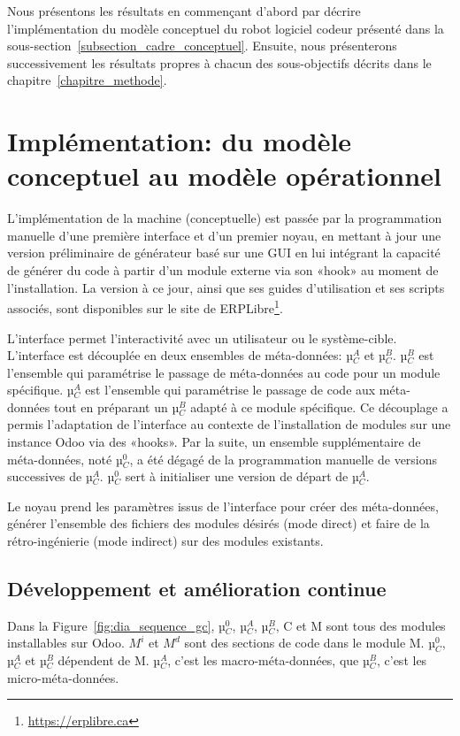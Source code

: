 \label{sec:Theme2}

Nous présentons les résultats en commençant d’abord par décrire l’implémentation du modèle conceptuel du robot logiciel codeur présenté dans la sous-section~\ref{subsection_cadre_conceptuel}. Ensuite, nous présenterons successivement les résultats propres à chacun des sous-objectifs décrits dans le chapitre~\ref{chapitre_methode}.

\section{Implémentation: du modèle conceptuel au modèle opérationnel}

L’implémentation de la machine (conceptuelle) est passée par la programmation manuelle d’une première interface et d’un premier noyau, en mettant à jour une version préliminaire de générateur basé sur une GUI\cite{bluiksnot_repo} en lui intégrant la capacité de générer du code à partir d’un module externe via son «hook» au moment de l’installation. La version à ce jour, ainsi que ses guides d’utilisation et ses scripts associés, sont disponibles sur le site de ERPLibre\footnote{\url{https://erplibre.ca}}.

L’interface permet l’interactivité avec un utilisateur ou le système-cible. L’interface est découplée en deux ensembles de méta-données: µ$_C^A$ et µ$_C^B$. µ$_C^B$ est l’ensemble qui paramétrise le passage de méta-données au code pour un module spécifique. µ$_C^A$ est l’ensemble qui paramétrise le passage de code aux méta-données tout en préparant un µ$_C^B$ adapté à ce module spécifique. Ce découplage a permis l’adaptation de l’interface au contexte de l’installation de modules sur une instance Odoo via des «hooks». Par la suite, un ensemble supplémentaire de méta-données, noté µ$_C^0$, a été dégagé de la programmation manuelle de versions successives de µ$_C^A$. µ$_C^0$ sert à initialiser une version de départ de µ$_C^A$.

Le noyau prend les paramètres issus de l’interface pour créer des méta-données, générer l’ensemble des fichiers des modules désirés (mode direct) et faire de la rétro-ingénierie (mode indirect) sur des modules existants.

\subsection{Développement et amélioration continue}

Dans la Figure~\ref{fig:dia_sequence_gc}, µ$_C^0$, µ$_C^A$, µ$_C^B$, C et M sont tous des modules installables sur Odoo. $M^i$ et $M^d$ sont des sections de code dans le module M. µ$_C^0$, µ$_C^A$ et µ$_C^B$ dépendent de M. µ$_C^A$, c’est les macro-méta-données, que µ$_C^B$, c’est les micro-méta-données.

